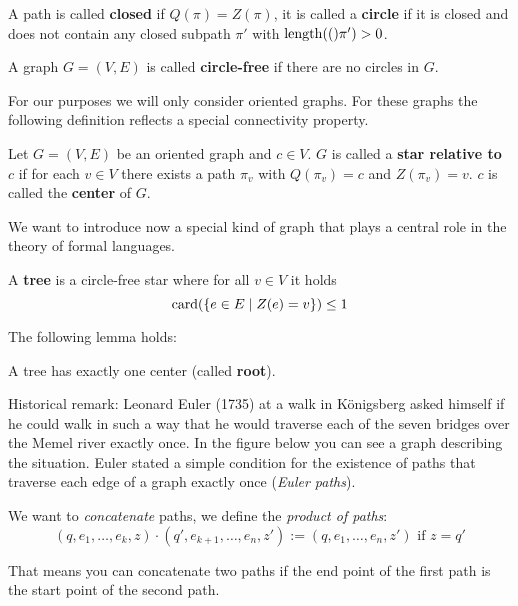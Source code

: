 A path is called {\bf closed} if $Q(\pi) = Z(\pi)$, it is called a {\bf circle}
if it is closed and does not contain any closed subpath $\pi'$ with $\mathrm{length}({(})\pi')
> 0$.

\bigskip
\begin{definition}
A graph $G = (V, E)$ is called {\bf circle-free} if there are no circles in $G$.
\end{definition}

For our purposes we will only consider oriented graphs. For these graphs the
following definition reflects a special connectivity property.

\begin{definition}
Let $G = (V, E)$ be an oriented graph and $c \in V$. $G$ is called a {\bf star
relative to $c$} if for each $v \in V$ there exists a path $\pi_{v}$ with
$Q(\pi_{v}) = c$ and $Z(\pi_{v}) = v$. $c$ is called the {\bf center} of $G$.
\end{definition}

We want to introduce now a special kind of graph that plays a central role in
the theory of formal languages.

\begin{definition}
A {\bf tree} is a circle-free star where for all $v \in V$ it holds
\[ \mathrm{card}({\mbox{$\{e \in E \mid Z(e) = v\}$}}) \leq 1 \]
\end{definition}

The following lemma holds:
\begin{lemma}
A tree has exactly one center (called {\bf root}).
\end{lemma}

Historical remark: Leonard Euler (1735) at a walk in Königsberg asked himself if
he could walk in such a way that he would traverse each of the seven bridges
over the Memel river exactly once. In the figure below you can see a graph
describing the situation. Euler stated a simple condition for the existence of
paths that traverse each edge of a graph exactly once ({\em Euler paths}).

\begin{center}

\end{center}

We want to {\em concatenate} paths, we define the {\em product of paths}:
\[ (q, e_1, \ldots, e_k, z) \cdot (q', e_{k+1}, \ldots, e_n, z') := (q, e_1,
\ldots, e_n, z')\text{ if } z = q' \]

That means you can concatenate two paths if the end point of the first path is
the start point of the second path.

